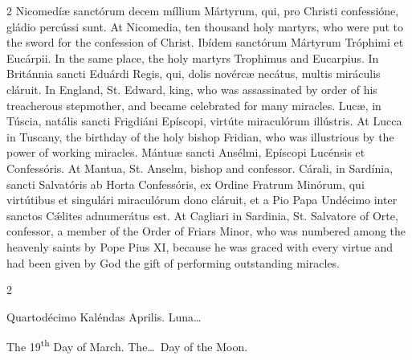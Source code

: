 \begin{paracol}{2}
\switchcolumn*
{}
Nicomedíæ sanctórum decem míllium Mártyrum, 
 qui, pro Christi confessióne, gládio percússi sunt.
\switchcolumn
{}
At Nicomedia, ten thousand holy martyrs, who were put to the sword for the 
 confession of Christ.
\switchcolumn*
{}
Ibídem sanctórum Mártyrum Tróphimi et Eucárpii.
\switchcolumn
{}
In the same place, the holy martyrs Trophimus and Eucarpius.
\switchcolumn*
{}
In Británnia sancti Eduárdi Regis, qui, dolis novércæ 
 necátus, multis miráculis cláruit.
\switchcolumn
{}
In England, St. Edward, king, who was assassinated by order of his 
 treacherous stepmother, and became celebrated for many miracles.
\switchcolumn*
{}
Lucæ, in Túscia, natális sancti Frigdiáni 
 Epíscopi, virtúte miraculórum illústris.
\switchcolumn
{}
At Lucca in Tuscany, the birthday of the holy bishop Fridian, who was 
 illustrious by the power of working miracles.
\switchcolumn*
{}
Mántuæ sancti Ansélmi, Epíscopi Lucénsis et 
 Confessóris.
\switchcolumn
{}
At Mantua, St. Anselm, bishop and confessor.
\switchcolumn*
{}
Cárali, in Sardínia, sancti Salvatóris ab Horta 
 Confessóris, ex Ordine Fratrum Minórum, qui virtútibus et singulári 
 miraculórum dono cláruit, et a Pio Papa Undécimo inter sanctos Cǽlites 
 adnumerátus est.
\switchcolumn
{}
At Cagliari in Sardinia, St. Salvatore of Orte, confessor, a member of the 
 Order of Friars Minor, who was numbered among the heavenly saints by Pope 
 Pius XI, because he was graced with every virtue and had been given by God 
 the gift of performing outstanding miracles.
\switchcolumn*
{}
\end{paracol}


\begin{paracol}{2}
\begin{center}{\color{gregoriocolor} Quartodécimo Kaléndas Aprilis. 
 Luna\dots\ }\end{center}
\switchcolumn
{}
\begin{center}{\color{gregoriocolor} The 19\textsuperscript{th} Day of March. 
 The\dots\ Day of the Moon.}\end{center}
\end{paracol}

